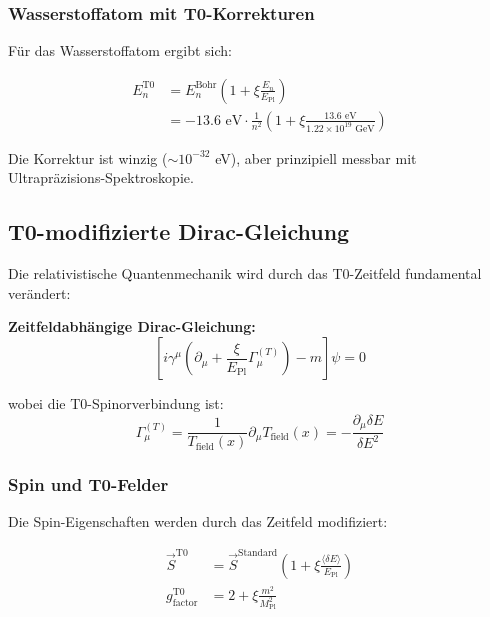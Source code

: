 \documentclass[12pt,a4paper]{article}
\newcommand{\xipar}{\xi}
\newcommand{\Tfield}{T_{\text{field}}}
\newcommand{\deltaE}{\delta E}
\newcommand{\EPlanck}{E_{\text{Pl}}}
\begin{document}
	\subsubsection{Wasserstoffatom mit T0-Korrekturen}
	
	Für das Wasserstoffatom ergibt sich:
	
	\begin{align}
		E_n^{\text{T0}} &= E_n^{\text{Bohr}} \left(1 + \xipar \frac{E_n}{\EPlanck}\right) \\
		&= -13.6 \text{ eV} \cdot \frac{1}{n^2} \left(1 + \xipar \frac{13.6 \text{ eV}}{1.22 \times 10^{19} \text{ GeV}}\right)
	\end{align}
	
	Die Korrektur ist winzig ($\sim 10^{-32}$ eV), aber prinzipiell messbar mit Ultrapräzisions-Spektroskopie.
	
	\subsection{T0-modifizierte Dirac-Gleichung}
	
	Die relativistische Quantenmechanik wird durch das T0-Zeitfeld fundamental verändert:
	
	\begin{tcolorbox}[colback=magenta!5!white,colframe=magenta!75!black,title=T0-Dirac-Gleichung]
		\textbf{Zeitfeldabhängige Dirac-Gleichung:}
		\begin{equation}
			\left[i\gamma^\mu \left(\partial_\mu + \frac{\xipar}{\EPlanck} \Gamma_\mu^{(T)}\right) - m\right]\psi = 0
		\end{equation}
		
		wobei die T0-Spinorverbindung ist:
		\begin{equation}
			\Gamma_\mu^{(T)} = \frac{1}{\Tfield(x)} \partial_\mu \Tfield(x) = -\frac{\partial_\mu \deltaE}{\deltaE^2}
		\end{equation}
	\end{tcolorbox}
	
	\subsubsection{Spin und T0-Felder}
	
	Die Spin-Eigenschaften werden durch das Zeitfeld modifiziert:
	
	\begin{align}
		\vec{S}^{\text{T0}} &= \vec{S}^{\text{Standard}} \left(1 + \xipar \frac{\langle\deltaE\rangle}{\EPlanck}\right) \\
		g_{\text{factor}}^{\text{T0}} &= 2 + \xipar \frac{m^2}{M_{\text{Pl}}^2}
	\end{align}
	
\end{document}
